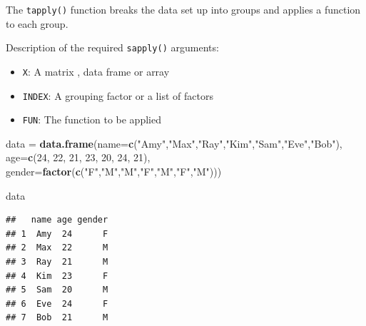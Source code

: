 \documentclass[
]{book}
\newenvironment{Shaded}{\begin{snugshade}}{\end{snugshade}}
\newcommand{\DataTypeTok}[1]{\textcolor[rgb]{0.13,0.29,0.53}{#1}}
\newcommand{\DecValTok}[1]{\textcolor[rgb]{0.00,0.00,0.81}{#1}}
\newcommand{\KeywordTok}[1]{\textcolor[rgb]{0.13,0.29,0.53}{\textbf{#1}}}
\newcommand{\NormalTok}[1]{#1}
\newcommand{\OperatorTok}[1]{\textcolor[rgb]{0.81,0.36,0.00}{\textbf{#1}}}
\newcommand{\StringTok}[1]{\textcolor[rgb]{0.31,0.60,0.02}{#1}}
\providecommand{\tightlist}{%
  \setlength{\itemsep}{0pt}\setlength{\parskip}{0pt}}
\begin{document}
The \texttt{tapply()} function breaks the data set up into groups and applies a function to each group.

Description of the required \texttt{sapply()} arguments:

\begin{itemize}
\tightlist
\item
  \texttt{X}: A matrix , data frame or array
\item
  \texttt{INDEX}: A grouping factor or a list of factors
\item
  \texttt{FUN}: The function to be applied
\end{itemize}

\begin{Shaded}
\begin{Highlighting}[]
\NormalTok{data =}\StringTok{ }\KeywordTok{data.frame}\NormalTok{(}\DataTypeTok{name=}\KeywordTok{c}\NormalTok{(}\StringTok{"Amy"}\NormalTok{,}\StringTok{"Max"}\NormalTok{,}\StringTok{"Ray"}\NormalTok{,}\StringTok{"Kim"}\NormalTok{,}\StringTok{"Sam"}\NormalTok{,}\StringTok{"Eve"}\NormalTok{,}\StringTok{"Bob"}\NormalTok{), }
                  \DataTypeTok{age=}\KeywordTok{c}\NormalTok{(}\DecValTok{24}\NormalTok{, }\DecValTok{22}\NormalTok{, }\DecValTok{21}\NormalTok{, }\DecValTok{23}\NormalTok{, }\DecValTok{20}\NormalTok{, }\DecValTok{24}\NormalTok{, }\DecValTok{21}\NormalTok{),}
                  \DataTypeTok{gender=}\KeywordTok{factor}\NormalTok{(}\KeywordTok{c}\NormalTok{(}\StringTok{"F"}\NormalTok{,}\StringTok{"M"}\NormalTok{,}\StringTok{"M"}\NormalTok{,}\StringTok{"F"}\NormalTok{,}\StringTok{"M"}\NormalTok{,}\StringTok{"F"}\NormalTok{,}\StringTok{"M"}\NormalTok{))) }

\NormalTok{data}
\end{Highlighting}
\end{Shaded}

\begin{verbatim}
##   name age gender
## 1  Amy  24      F
## 2  Max  22      M
## 3  Ray  21      M
## 4  Kim  23      F
## 5  Sam  20      M
## 6  Eve  24      F
## 7  Bob  21      M
\end{verbatim}

\begin{Shaded}
\end{Shaded}
\end{document}
